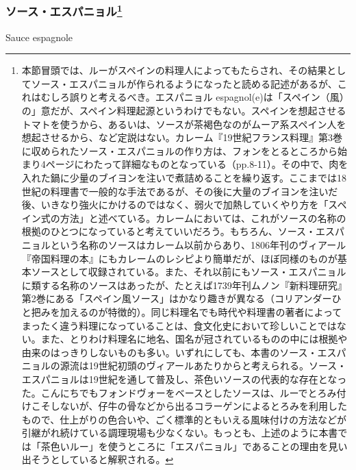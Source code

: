 \begin{recette}

\hypertarget{sauce-espagnole}{%
\subsubsection[ソース・エスパニョル]{\texorpdfstring{ソース・エスパニョル\footnote{本節冒頭では、ルーがスペインの料理人によってもたらされ、その結果としてソース・エスパニョルが作られるようになったと読める記述があるが、これはむしろ誤りと考えるべき。エスパニョル
  espagnol(e)は「スペイン（風）の」意だが、スペイン料理起源というわけでもない。スペインを想起させるトマトを使うから、あるいは、ソースが茶褐色なのがムーア系スペイン人を想起させるから、など定説はない。カレーム『19世紀フランス料理』第3巻に収められたソース・エスパニョルの作り方は、フォンをとるところから始まり4ページにわたって詳細なものとなっている（pp.8-11）。その中で、肉を入れた鍋に少量のブイヨンを注いで煮詰めることを繰り返す。ここまでは18世紀の料理書で一般的な手法であるが、その後に大量のブイヨンを注いだ後、いきなり強火にかけるのではなく、弱火で加熱していくやり方を「スペイン式の方法」と述べている。カレームにおいては、これがソースの名称の根拠のひとつになっていると考えていいだろう。もちろん、ソース・エスパニョルという名称のソースはカレーム以前からあり、1806年刊のヴィアール『帝国料理の本』にもカレームのレシピより簡単だが、ほぼ同様のものが基本ソースとして収録されている。また、それ以前にもソース・エスパニョルに類する名称のソースはあったが、たとえば1739年刊ムノン『新料理研究』第2巻にある「スペイン風ソース」はかなり趣きが異なる（コリアンダーひと把みを加えるのが特徴的）。同じ料理名でも時代や料理書の著者によってまったく違う料理になっていることは、食文化史において珍しいことではない。また、とりわけ料理名に地名、国名が冠されているものの中には根拠や由来のはっきりしないものも多い。いずれにしても、本書のソース・エスパニョルの源流は19世紀初頭のヴィアールあたりからと考えられる。ソース・エスパニョルは19世紀を通して普及し、茶色いソースの代表的な存在となった。こんにちでもフォンドヴォーをベースとしたソースは、ルーでとろみ付けこそしないが、仔牛の骨などから出るコラーゲンによるとろみを利用したもので、仕上がりの色合いや、ごく標準的ともいえる風味付けの方法などが引継がれ続けている調理現場も少なくない。もっとも、上述のように本書では「茶色いルー」を使うところに「エスパニョル」であることの理由を見い出そうとしていると解釈される。}}{ソース・エスパニョル}}\label{sauce-espagnole}}

\begin{frsubenv}

Sauce espagnole


\end{frsubenv}
\end{recette}
